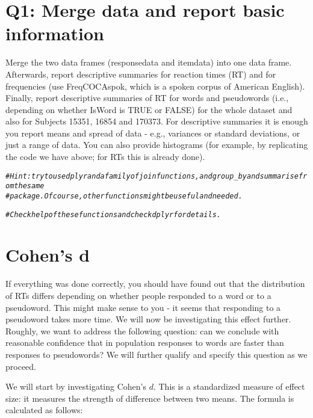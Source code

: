 \documentclass{article}\usepackage[]{graphicx}\usepackage[]{color}
\makeatletter
\newcommand{\hlcom}[1]{\textcolor[rgb]{0.678,0.584,0.686}{\textit{#1}}}%
\newenvironment{kframe}{%
 \def\at@end@of@kframe{}%
 \ifinner\ifhmode%
  \def\at@end@of@kframe{\end{minipage}}%
  \begin{minipage}{\columnwidth}%
 \fi\fi%
 \def\FrameCommand##1{\hskip\@totalleftmargin \hskip-\fboxsep
 \colorbox{shadecolor}{##1}\hskip-\fboxsep
     \hskip-\linewidth \hskip-\@totalleftmargin \hskip\columnwidth}%
 \MakeFramed {\advance\hsize-\width
   \@totalleftmargin\z@ \linewidth\hsize
   \@setminipage}}%
 {\par\unskip\endMakeFramed%
 \at@end@of@kframe}
\newenvironment{knitrout}{}{} %
\makeatother
\begin{document}
\section*{Q1: Merge data and report basic information}

Merge the two data frames (responsedata and itemdata) into one data frame. Afterwards, report descriptive summaries for reaction times (RT) and for frequencies (use FreqCOCAspok, which is a spoken corpus of American English). Finally, report descriptive summaries of RT for words and pseudowords (i.e., depending on whether IsWord is TRUE or FALSE) for the whole dataset and also for Subjects 15351, 16854 and 170373. For descriptive summaries it is enough you report means and spread of data - e.g., variances or standard deviations, or just a range of data. You can also provide histograms (for example, by replicating the code we have above; for RTs this is already done).

\begin{knitrout}
\color{fgcolor}\begin{kframe}
\begin{alltt}
\hlcom{# Hint: try to use dplyr and a family of join functions, and group_by and summarise from the same}
\hlcom{# package.  Of course, other functions might be useful and needed.}

\hlcom{# Check help of these functions and check dplyr for details.}
\end{alltt}
\end{kframe}
\end{knitrout}

\section{Cohen's d}

If everything was done correctly, you should have found out that the distribution of RTs differs depending on whether people responded to a word or to a pseudoword. This might make sense to you - it seems that responding to a pseudoword takes more time. We will now be investigating this effect further. Roughly, we want to address the following question: can we conclude with reasonable confidence that in population responses to words are faster than responses to pseudowords? We will further qualify and specify this question as we proceed.

We will start by investigating Cohen's $d$. This is a standardized measure of effect size: it measures the strength of difference between two means. The formula is calculated as follows:
\end{document}

